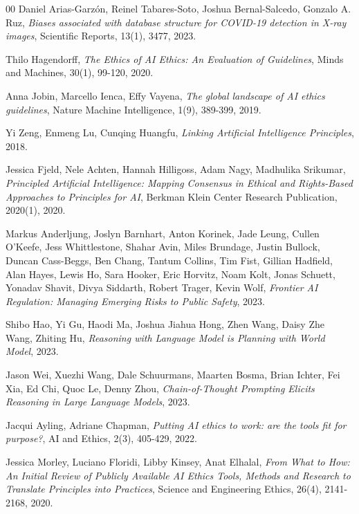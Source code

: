 \documentclass[fleqn,10pt]{wlscirep}
\begin{document}
\begin{thebibliography}{00}
  Daniel Arias-Garzón, Reinel Tabares-Soto, Joshua Bernal-Salcedo, Gonzalo A. Ruz,
  \textit{Biases associated with database structure for COVID-19 detection in X-ray images},
  Scientific Reports,
  13(1),
  3477,
  2023.


  Thilo Hagendorff,
  \textit{The Ethics of AI Ethics: An Evaluation of Guidelines},
  Minds and Machines,
  30(1),
  99-120,
  2020.


  Anna Jobin, Marcello Ienca, Effy Vayena,
  \textit{The global landscape of AI ethics guidelines},
  Nature Machine Intelligence,
  1(9),
  389-399,
  2019.


  Yi Zeng, Enmeng Lu, Cunqing Huangfu,
  \textit{Linking Artificial Intelligence Principles},
  2018.


  Jessica Fjeld, Nele Achten, Hannah Hilligoss, Adam Nagy, Madhulika Srikumar,
  \textit{Principled Artificial Intelligence: Mapping Consensus in Ethical and Rights-Based Approaches to Principles for AI},
  Berkman Klein Center Research Publication,
  2020(1),
  2020.


  Markus Anderljung, Joslyn Barnhart, Anton Korinek, Jade Leung, Cullen O'Keefe, Jess Whittlestone, Shahar Avin, Miles Brundage, Justin Bullock, Duncan Cass-Beggs, Ben Chang, Tantum Collins, Tim Fist, Gillian Hadfield, Alan Hayes, Lewis Ho, Sara Hooker, Eric Horvitz, Noam Kolt, Jonas Schuett, Yonadav Shavit, Divya Siddarth, Robert Trager, Kevin Wolf,
  \textit{Frontier AI Regulation: Managing Emerging Risks to Public Safety},
  2023.


  Shibo Hao, Yi Gu, Haodi Ma, Joshua Jiahua Hong, Zhen Wang, Daisy Zhe Wang, Zhiting Hu,
  \textit{Reasoning with Language Model is Planning with World Model},
  2023.


  Jason Wei, Xuezhi Wang, Dale Schuurmans, Maarten Bosma, Brian Ichter, Fei Xia, Ed Chi, Quoc Le, Denny Zhou,
  \textit{Chain-of-Thought Prompting Elicits Reasoning in Large Language Models},
  2023.


  Jacqui Ayling, Adriane Chapman,
  \textit{Putting AI ethics to work: are the tools fit for purpose?},
  AI and Ethics,
  2(3),
  405-429,
  2022.


  Jessica Morley, Luciano Floridi, Libby Kinsey, Anat Elhalal,
  \textit{From What to How: An Initial Review of Publicly Available AI Ethics Tools, Methods and Research to Translate Principles into Practices},
  Science and Engineering Ethics,
  26(4),
  2141-2168,
  2020.



\end{thebibliography}
\end{document}
